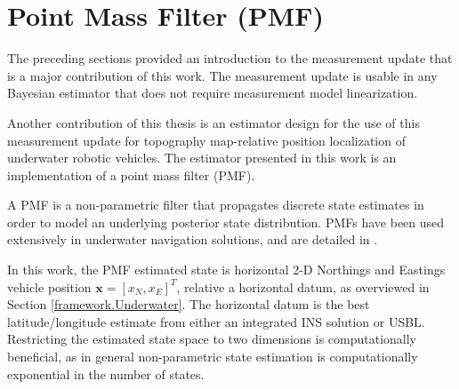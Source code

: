 
\section{Point Mass Filter (PMF)}
\label{framework.PMF}

The preceding sections provided an introduction to the measurement update that is a major contribution of this work.
The measurement update is usable in any Bayesian estimator that does not require measurement model linearization.

Another contribution of this thesis is an estimator design for the use of this measurement update for topography map-relative position localization of underwater robotic vehicles.
The estimator presented in this work is an implementation of a point mass filter (PMF).

A PMF is a non-parametric filter that propagates discrete state estimates in order to model an underlying posterior state distribution.
PMFs have been used extensively in underwater navigation solutions, and are detailed in \cite{Anonsen2006}.  

In this work, the PMF estimated state is horizontal 2-D Northings and Eastings vehicle position $\textbf{x} = [x_{N}, x_{E}]^{T}$, relative a horizontal datum, as overviewed in Section \ref{framework.Underwater}.
The horizontal datum is the best latitude/longitude estimate from either an integrated INS solution or USBL.
Restricting the estimated state space to two dimensions is computationally beneficial, as in general non-parametric state estimation is computationally exponential in the number of states.

%
%

